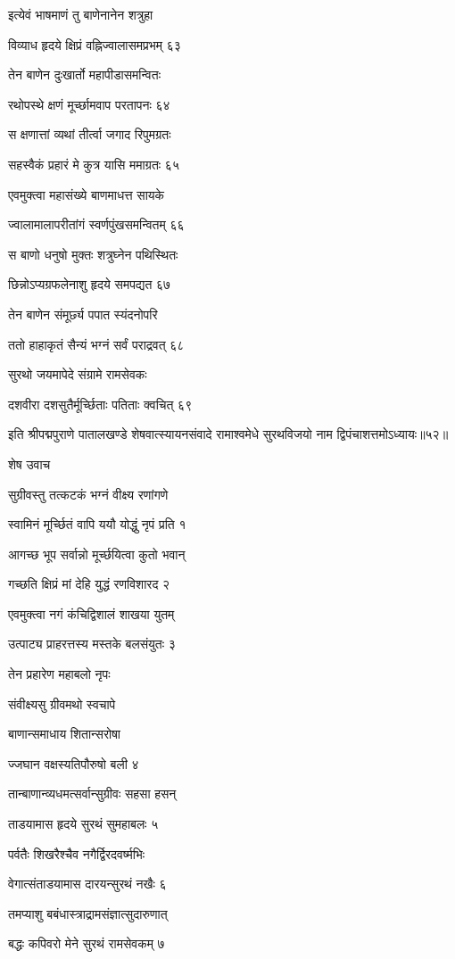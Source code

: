 इत्येवं भाषमाणं तु बाणेनानेन शत्रुहा

विव्याध हृदये क्षिप्रं वह्निज्वालासमप्रभम् ६३

तेन बाणेन दुःखार्तो महापीडासमन्वितः

रथोपस्थे क्षणं मूर्च्छामवाप परतापनः ६४

स क्षणात्तां व्यथां तीर्त्वा जगाद रिपुमग्रतः

सहस्वैकं प्रहारं मे कुत्र यासि ममाग्रतः ६५

एवमुक्त्वा महासंख्ये बाणमाधत्त सायके

ज्वालामालापरीतांगं स्वर्णपुंखसमन्वितम् ६६

स बाणो धनुषो मुक्तः शत्रुघ्नेन पथिस्थितः

छिन्नोऽप्यग्रफलेनाशु हृदये समपद्यत ६७

तेन बाणेन संमूर्छ्य पपात स्यंदनोपरि

ततो हाहाकृतं सैन्यं भग्नं सर्वं पराद्रवत् ६८

सुरथो जयमापेदे संग्रामे रामसेवकः

दशवीरा दशसुतैर्मूर्च्छिताः पतिताः क्वचित् ६९

इति श्रीपद्मपुराणे पातालखण्डे शेषवात्स्यायनसंवादे रामाश्वमेधे सुरथविजयो नाम द्विपंचाशत्तमोऽध्यायः॥५२॥


शेष उवाच

सुग्रीवस्तु तत्कटकं भग्नं वीक्ष्य रणांगणे

स्वामिनं मूर्च्छितं वापि ययौ योद्धुं नृपं प्रति १

आगच्छ भूप सर्वान्नो मूर्च्छयित्वा कुतो भवान्

गच्छति क्षिप्रं मां देहि युद्धं रणविशारद २

एवमुक्त्वा नगं कंचिद्विशालं शाखया युतम्

उत्पाट्य प्राहरत्तस्य मस्तके बलसंयुतः ३

तेन प्रहारेण महाबलो नृपः

संवीक्ष्यसु ग्रीवमथो स्वचापे

बाणान्समाधाय शितान्सरोषा

ज्जघान वक्षस्यतिपौरुषो बली ४

तान्बाणान्व्यधमत्सर्वान्सुग्रीवः सहसा हसन्

ताडयामास हृदये सुरथं सुमहाबलः ५

पर्वतैः शिखरैश्चैव नगैर्द्विरदवर्ष्मभिः

वेगात्संताडयामास दारयन्सुरथं नखैः ६

तमप्याशु बबंधास्त्राद्रामसंज्ञात्सुदारुणात्

बद्धः कपिवरो मेने सुरथं रामसेवकम् ७


